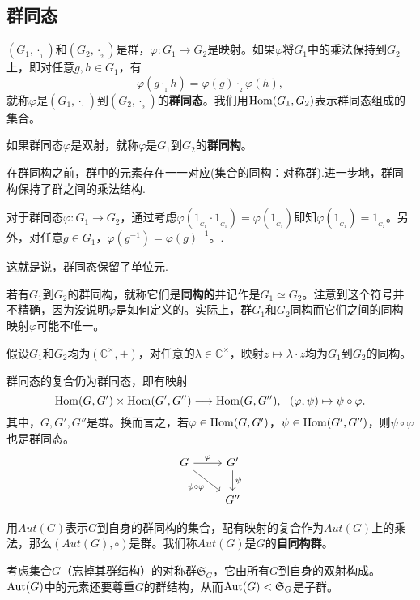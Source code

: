 \documentclass[lang=cn,10pt]{elegantbook}
\begin{document}
	\subsection{群同态}
	\begin{definition}[群同态]
		$(G_1,\cdot_{_1})$和$(G_2,\cdot_{_2})$是群，$\varphi\colon G_1\rightarrow G_2$是映射。如果$\varphi$将\(G_1\)中的乘法保持到\(G_2\)上，即对任意$g,h\in G_1$，有
		\[\varphi(g \cdot_{_1} h)=\varphi(g)\cdot_{_2} \varphi(h),\]
		就称$\varphi$是$(G_1,\cdot_{_1})$到$(G_2,\cdot_{_2})$的{\bf 群同态}。我们用${\rm Hom}(G_1,G_2)$表示群同态组成的集合。
		
		如果群同态$\varphi$是双射，就称$\varphi$是$G_1$到$G_2$的{\bf 群同构}。
	\end{definition}
	\begin{note}
		在群同构之前，群中的元素存在一一对应(集合的同构：对称群).进一步地，群同构保持了群之间的乘法结构.
	\end{note}
	\begin{property}
		对于群同态$\varphi\colon G_1\rightarrow G_2$，通过考虑$\varphi(1_{_{G_1}}\cdot 1_{_{G_1}})=\varphi(1_{_{G_1}})$即知$\varphi(1_{_{G_1}})=1_{_{G_2}}$。另外，对任意$g\in G_1$，$\varphi(g^{-1})=\varphi(g)^{-1}$。.
		
		这就是说，群同态保留了单位元.
	\end{property}
	\begin{note}
		若有$G_1$到$G_2$的群同构，就称它们是{\bf 同构的}并记作是$G_1\simeq G_2$。注意到这个符号并不精确，因为没说明$\varphi$是如何定义的。实际上，群$G_1$和$G_2$同构而它们之间的同构映射$\varphi$可能不唯一。
		
		假设$G_1$和$G_2$均为\((\mathbb{C}^\times,+)\)，对任意的$\lambda\in $\(\mathbb{C}^\times\)，映射$z\mapsto \lambda \cdot z$均为$G_1$到$G_2$的同构。
	\end{note}
	\begin{proposition}[同态的复合]
		群同态的复合仍为群同态，即有映射
		\[{\rm Hom}(G,G')\times {\rm Hom}(G',G'') \longrightarrow {\rm Hom}(G,G''), \ \ (\varphi,\psi)\mapsto\psi\circ \varphi . \]
		其中，$G,G',G''$是群。换而言之，若$\varphi\in {\rm Hom}(G,G')$，$\psi\in {\rm Hom}(G',G'')$，则$\psi\circ \varphi$也是群同态。
		\[\begin{tikzcd}
			G \arrow[r, "\varphi"] \arrow[dr, "\psi\circ\varphi",swap] &  G' \arrow[d, "\psi"]\\
			&G''           \end{tikzcd}
		\]	
	\end{proposition}	
	\begin{definition}[自同构]
		用$Aut(G)$表示$G$到自身的群同构的集合，配有映射的复合作为$Aut(G)$上的乘法，那么$(Aut(G),\circ)$是群。我们称$Aut(G)$是$G$的{\bf 自同构群}。
		
		考虑集合$G$（忘掉其群结构）的对称群$\mathfrak{S}_G$，它由所有$G$到自身的双射构成。${\rm Aut}(G)$中的元素还要尊重$G$的群结构，从而${\rm Aut}(G)<\mathfrak{S}_G$是子群。
	\end{definition}
\end{document}
